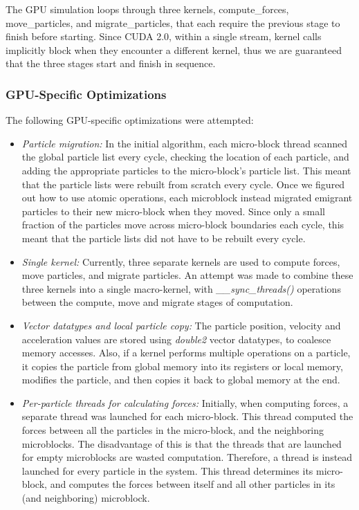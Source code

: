 \documentclass[11pt]{article} %
\begin{document}
The GPU simulation loops through three kernels, compute\_forces, move\_particles, and migrate\_particles, that each require the previous stage to finish before starting. Since CUDA 2.0, within a single stream, kernel calls implicitly block when they encounter a different kernel, thus we are guaranteed that the three stages start and finish in sequence. 

\subsubsection{GPU-Specific Optimizations}
\label{gpu-optimization-section}

The following GPU-specific optimizations were attempted:

\begin{itemize}
\item {\em Particle migration: } In the initial algorithm, each micro-block thread scanned the global particle list every cycle, checking the location of each particle, and adding the appropriate particles to the micro-block's particle list. This meant that the particle lists were rebuilt from scratch every cycle. Once we figured out how to use atomic operations, each microblock instead migrated emigrant particles to their new micro-block when they moved. Since only a small fraction of the particles move across micro-block boundaries each cycle, this meant that the particle lists did not have to be rebuilt every cycle.

\item {\em Single kernel: } Currently, three separate kernels are used to compute forces, move particles, and migrate particles. An attempt was made to combine these three kernels into a single macro-kernel, with {\em \_\_sync\_threads()} operations between the compute, move and migrate stages of computation.

\item {\em Vector datatypes and local particle copy: } The particle position, velocity and acceleration values are stored using {\em double2} vector datatypes, to coalesce memory accesses. Also, if a kernel performs multiple operations on a particle, it copies the particle from global memory into its registers or local memory, modifies the particle, and then copies it back to global memory at the end.

\item {\em Per-particle threads for calculating forces: } Initially, when computing forces, a separate thread was launched for each micro-block. This thread computed the forces between all the particles in the micro-block, and the neighboring microblocks. The disadvantage of this is that the threads that are launched for empty microblocks are wasted computation. Therefore, a thread is instead launched for every particle in the system. This thread determines its micro-block, and computes the forces between itself and all other particles in its (and neighboring) microblock.


\end{itemize}
\end{document}
